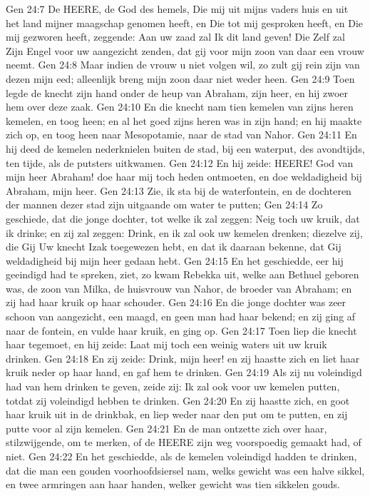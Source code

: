 Gen 24:7  De HEERE, de God des hemels, Die mij uit mijns vaders huis en uit het land mijner maagschap genomen heeft, en Die tot mij gesproken heeft, en Die mij gezworen heeft, zeggende: Aan uw zaad zal Ik dit land geven! Die Zelf zal Zijn Engel voor uw aangezicht zenden, dat gij voor mijn zoon van daar een vrouw neemt.
Gen 24:8  Maar indien de vrouw u niet volgen wil, zo zult gij rein zijn van dezen mijn eed; alleenlijk breng mijn zoon daar niet weder heen.
Gen 24:9  Toen legde de knecht zijn hand onder de heup van Abraham, zijn heer, en hij zwoer hem over deze zaak.
Gen 24:10  En die knecht nam tien kemelen van zijns heren kemelen, en toog heen; en al het goed zijns heren was in zijn hand; en hij maakte zich op, en toog heen naar Mesopotamie, naar de stad van Nahor.
Gen 24:11  En hij deed de kemelen nederknielen buiten de stad, bij een waterput, des avondtijds, ten tijde, als de putsters uitkwamen.
Gen 24:12  En hij zeide: HEERE! God van mijn heer Abraham! doe haar mij toch heden ontmoeten, en doe weldadigheid bij Abraham, mijn heer.
Gen 24:13  Zie, ik sta bij de waterfontein, en de dochteren der mannen dezer stad zijn uitgaande om water te putten;
Gen 24:14  Zo geschiede, dat die jonge dochter, tot welke ik zal zeggen: Neig toch uw kruik, dat ik drinke; en zij zal zeggen: Drink, en ik zal ook uw kemelen drenken; diezelve zij, die Gij Uw knecht Izak toegewezen hebt, en dat ik daaraan bekenne, dat Gij weldadigheid bij mijn heer gedaan hebt.
Gen 24:15  En het geschiedde, eer hij geeindigd had te spreken, ziet, zo kwam Rebekka uit, welke aan Bethuel geboren was, de zoon van Milka, de huisvrouw van Nahor, de broeder van Abraham; en zij had haar kruik op haar schouder.
Gen 24:16  En die jonge dochter was zeer schoon van aangezicht, een maagd, en geen man had haar bekend; en zij ging af naar de fontein, en vulde haar kruik, en ging op.
Gen 24:17  Toen liep die knecht haar tegemoet, en hij zeide: Laat mij toch een weinig waters uit uw kruik drinken.
Gen 24:18  En zij zeide: Drink, mijn heer! en zij haastte zich en liet haar kruik neder op haar hand, en gaf hem te drinken.
Gen 24:19  Als zij nu voleindigd had van hem drinken te geven, zeide zij: Ik zal ook voor uw kemelen putten, totdat zij voleindigd hebben te drinken.
Gen 24:20  En zij haastte zich, en goot haar kruik uit in de drinkbak, en liep weder naar den put om te putten, en zij putte voor al zijn kemelen.
Gen 24:21  En de man ontzette zich over haar, stilzwijgende, om te merken, of de HEERE zijn weg voorspoedig gemaakt had, of niet.
Gen 24:22  En het geschiedde, als de kemelen voleindigd hadden te drinken, dat die man een gouden voorhoofdsiersel nam, welks gewicht was een halve sikkel, en twee armringen aan haar handen, welker gewicht was tien sikkelen gouds.
